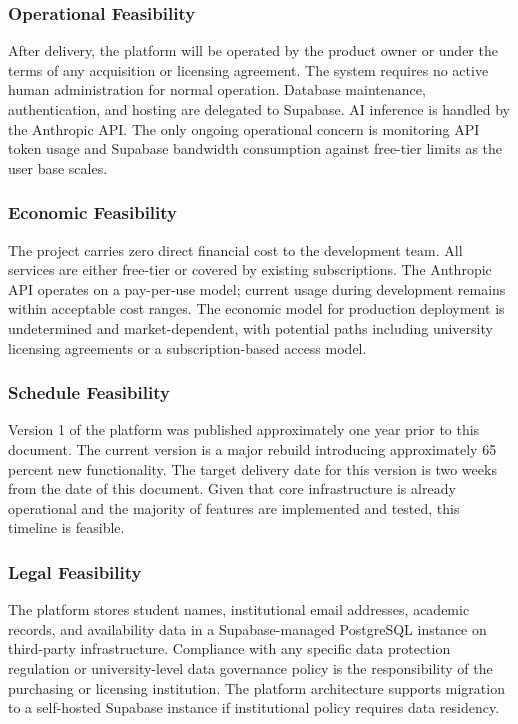 \documentclass[12pt,a4paper]{article}
\begin{document}
\subsubsection{Operational Feasibility}

After delivery, the platform will be operated by the product owner or under the terms of
any acquisition or licensing agreement. The system requires no active human administration
for normal operation. Database maintenance, authentication, and hosting are delegated to
Supabase. AI inference is handled by the Anthropic API. The only ongoing operational
concern is monitoring API token usage and Supabase bandwidth consumption against free-tier
limits as the user base scales.

\subsubsection{Economic Feasibility}

The project carries zero direct financial cost to the development team. All services are
either free-tier or covered by existing subscriptions. The Anthropic API operates on a
pay-per-use model; current usage during development remains within acceptable cost ranges.
The economic model for production deployment is undetermined and market-dependent, with
potential paths including university licensing agreements or a subscription-based access
model.

\subsubsection{Schedule Feasibility}

Version 1 of the platform was published approximately one year prior to this document.
The current version is a major rebuild introducing approximately 65 percent new
functionality. The target delivery date for this version is two weeks from the date of
this document. Given that core infrastructure is already operational and the majority of
features are implemented and tested, this timeline is feasible.

\subsubsection{Legal Feasibility}

The platform stores student names, institutional email addresses, academic records, and
availability data in a Supabase-managed PostgreSQL instance on third-party infrastructure.
Compliance with any specific data protection regulation or university-level data governance
policy is the responsibility of the purchasing or licensing institution. The platform
architecture supports migration to a self-hosted Supabase instance if institutional policy
requires data residency.
\end{document}
